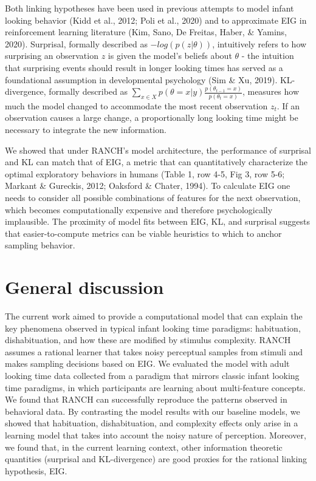 \documentclass[10pt, letterpaper]{article}
\begin{document}
Both linking hypotheses have been used in previous attempts to model
infant looking behavior (Kidd et al., 2012; Poli et al., 2020) and to
approximate EIG in reinforcement learning literature (Kim, Sano, De
Freitas, Haber, \& Yamins, 2020). Surprisal, formally described as
\(-log(p(z|\theta))\), intuitively refers to how surprising an
observation \(z\) is given the model's beliefs about \(\theta\) - the
intuition that surprising events should result in longer looking times
has served as a foundational assumption in developmental psychology (Sim
\& Xu, 2019). KL-divergence, formally described as
\(\sum_{x \in X}{p(\theta = x|y)\frac{p(\theta_{t-1} = x)}{p(\theta_t = x)}}\),
measures how much the model changed to accommodate the most recent
observation \(z_t\). If an observation causes a large change, a
proportionally long looking time might be necessary to integrate the new
information.

We showed that under RANCH's model architecture, the performance of
surprisal and KL can match that of EIG, a metric that can quantitatively
characterize the optimal exploratory behaviors in humans (Table 1, row
4-5, Fig 3, row 5-6; Markant \& Gureckis, 2012; Oaksford \& Chater,
1994). To calculate EIG one needs to consider all possible combinations
of features for the next observation, which becomes computationally
expensive and therefore psychologically implausible. The proximity of
model fits between EIG, KL, and surprisal suggests that
easier-to-compute metrics can be viable heuristics to which to anchor
sampling behavior.

\hypertarget{general-discussion}{%
\section{General discussion}\label{general-discussion}}

The current work aimed to provide a computational model that can explain
the key phenomena observed in typical infant looking time paradigms:
habituation, dishabituation, and how these are modified by stimulus
complexity. RANCH assumes a rational learner that takes noisy perceptual
samples from stimuli and makes sampling decisions based on EIG. We
evaluated the model with adult looking time data collected from a
paradigm that mirrors classic infant looking time paradigms, in which
participants are learning about multi-feature concepts. We found that
RANCH can successfully reproduce the patterns observed in behavioral
data. By contrasting the model results with our baseline models, we
showed that habituation, dishabituation, and complexity effects only
arise in a learning model that takes into account the noisy nature of
perception. Moreover, we found that, in the current learning context,
other information theoretic quantities (surprisal and KL-divergence) are
good proxies for the rational linking hypothesis, EIG.
\end{document}
